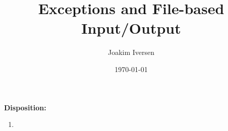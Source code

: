 \documentclass{article}
\title{Exceptions and File-based Input/Output}
\author{Joakim Iversen}
\date{\today}
\begin{document}
\maketitle
\newpage

\textbf{\Large Disposition:}
\begin{enumerate}
    \item 
\end{enumerate}
\end{document}
